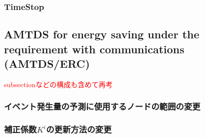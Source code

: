 \documentclass[12pt,a4j,twoside]{jarticle}
\def\red#1{\textcolor{red}{#1}}
\begin{document}
  \subsubsection{TimeStop}\label{sec:TimeStop}

  




  
  \subsection{AMTDS for energy saving under the requirement with communications (AMTDS/ERC)}
  \red{subsectionなどの構成も含めて再考}



  \subsubsection{イベント発生量の予測に使用するノードの範囲の変更}
  
  \subsubsection{補正係数$K^i$の更新方法の変更}
\end{document}
